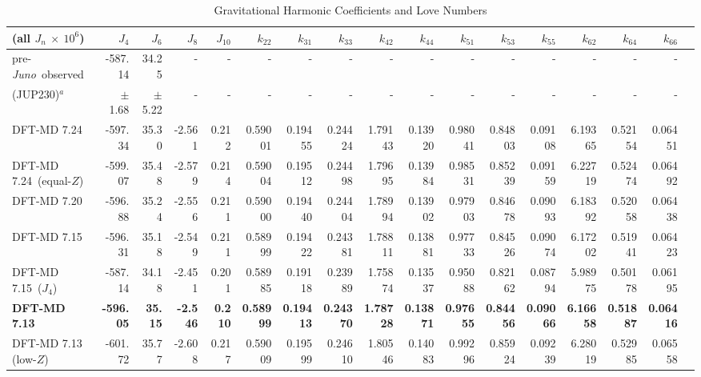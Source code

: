 \begin{sidewaystable}
\caption{Gravitational Harmonic Coefficients and Love Numbers\label{tab:model_harmonics}}

\begin{adjustbox}{max width=\textheight}
\begin{tabular}{l|rrrr|rrrrrrrrrrrr}
    \hline
(all $J_n$ $\times$ $10^6$) &  $J_{4}$ &  $J_{6}$ &  $J_{8}$ &  $J_{10}$ &  $k_{22}$ &  $k_{31}$ &  $k_{33}$ &
$k_{42}$ &  $k_{44}$ &  $k_{51}$ &  $k_{53}$ &  $k_{55}$ &  $k_{62}$ &  $k_{64}$ &
$k_{66}$ \\
\hline
pre-\textit{Juno}~observed &  -587.14 &    34.25 &   - & - & - &
- & - & - & - & - & - & - & - &
- & -  \\
(JUP230)$^a$ &  $\pm$1.68 &   $\pm$5.22 &   - & - & - &
- & - & - & - & - & - & - & - &
- & -  \\
\hline
DFT-MD 7.24            &  -597.34 &    35.30 &   -2.561 &     0.212 &   0.59001 &   0.19455 &   0.24424 &   1.79143 &   0.13920 &   0.98041 &   0.84803 &   0.09108 &   6.19365 &   0.52154 &   0.06451 \\
DFT-MD 7.24~(equal-$Z$) &  -599.07 &    35.48 &   -2.579 &     0.214 &   0.59004 &   0.19512 &   0.24498 &   1.79695 &   0.13984 &   0.98531 &   0.85239 &   0.09159 &   6.22719 &   0.52474 &   0.06492 \\
DFT-MD 7.20            &  -596.88 &    35.24 &   -2.556 &     0.211 &   0.59000 &   0.19440 &   0.24404 &   1.78994 &   0.13902 &   0.97903 &   0.84678 &   0.09093 &   6.18392 &   0.52058 &   0.06438 \\
DFT-MD 7.15            &  -596.31 &    35.18 &   -2.549 &     0.211 &   0.58999 &   0.19422 &   0.24381 &   1.78811 &   0.13881 &   0.97733 &   0.84526 &   0.09074 &   6.17202 &   0.51941 &   0.06423 \\
DFT-MD 7.15~($J_4$)     &  -587.14 &    34.18 &   -2.451 &     0.201 &   0.58985 &   0.19118 &   0.23989 &   1.75874 &   0.13537 &   0.95088 &   0.82162 &   0.08794 &   5.98975 &   0.50178 &   0.06195 \\
{\bf DFT-MD 7.13}        & {\bf -596.05} &  {\bf   35.15} &  {\bf  -2.546} &    {\bf
0.210} &  {\bf  0.58999} &   {\bf 0.19413} &   {\bf 0.24370} &   {\bf 1.78728} &
{\bf 0.13871} &   {\bf 0.97655} &   {\bf 0.84456} &   {\bf 0.09066} &   {\bf 6.16658}
&   {\bf 0.51887} &   {\bf 0.06416} \\
DFT-MD 7.13 (low-$Z$)   &  -601.72 &    35.77 &   -2.608 &     0.217 &   0.59009 &   0.19599 &   0.24610 &   1.80546 &   0.14083 &   0.99296 &   0.85924 &   0.09239 &   6.28019 &   0.52985 &   0.06558 \\

\end{tabular}
\end{adjustbox}
\end{sidewaystable}
